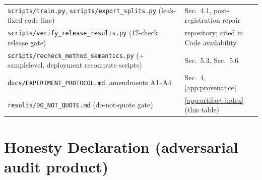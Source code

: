 \documentclass[review,12pt,nonatbib]{elsarticle}
\begin{document}
\begin{table}[tb]
\begin{tabular}{p{}p{}}
\texttt{scripts/train.py}, \texttt{scripts/export\_splits.py} (leak-fixed code line) & Sec.~4.1, post-registration repair \\
\texttt{scripts/verify\_release\_results.py} (12-check release gate) & repository; cited in Code availability \\
\texttt{scripts/recheck\_method\_semantics.py} (+ samplelevel, deployment recompute scripts) & Sec.~5.3, Sec.~5.6 \\
\texttt{docs/EXPERIMENT\_PROTOCOL.md}, amendments A1--A4 & Sec.~4, \ref{app:provenance} \\
\texttt{results/DO\_NOT\_QUOTE.md} (do-not-quote gate) & \ref{app:artifact-index} (this table) \\
\bottomrule
\end{tabular}
\end{table}
\section{Honesty Declaration (adversarial audit product)}
\label{sec:honesty}
\end{document}
